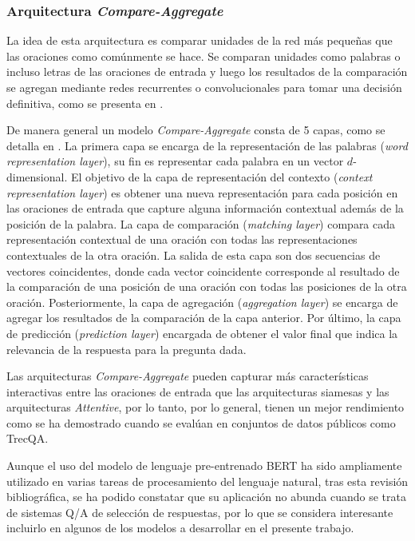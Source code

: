 \subsubsection{Arquitectura \textit{Compare-Aggregate}}

La idea de esta arquitectura es comparar unidades de la red más pequeñas que las oraciones como comúnmente se hace. Se comparan unidades como palabras o incluso letras de las oraciones de entrada y luego los resultados de la comparación se agregan mediante redes recurrentes o convolucionales para tomar una decisión definitiva, como se presenta en \cite{2018-tran-context}.

De manera general un modelo \textit{Compare-Aggregate} consta de 5 capas, como se detalla en \cite{2017-wang-bimpm}. La primera capa se encarga de la representación de las palabras (\textit{word representation layer}), su fin es representar cada palabra en un vector $d$-dimensional. El objetivo de la capa de representación del contexto (\textit{context representation layer}) es obtener una nueva representación para cada posición en las oraciones de entrada que capture alguna información contextual además de la posición de la palabra. La capa de comparación (\textit{matching layer}) compara cada representación contextual de una oración con todas las representaciones contextuales de la otra oración. La salida de esta capa son dos secuencias de vectores coincidentes, donde cada vector coincidente corresponde al resultado de la comparación de una posición de una oración con todas las posiciones de la otra oración. Posteriormente, la capa de agregación (\textit{aggregation layer}) se encarga de agregar los resultados de la comparación de la capa anterior. Por último, la capa de predicción (\textit{prediction layer}) encargada de obtener el valor final que indica la relevancia de la respuesta para la pregunta dada.

Las arquitecturas \textit{Compare-Aggregate} pueden capturar más características interactivas entre las oraciones de entrada que las arquitecturas siamesas y las arquitecturas \textit{Attentive}, por lo tanto, por lo general, tienen un mejor rendimiento como se ha demostrado cuando se evalúan en conjuntos de datos públicos como TrecQA.

Aunque el uso del modelo de lenguaje pre-entrenado BERT ha sido ampliamente utilizado en varias tareas de procesamiento del lenguaje natural, tras esta revisión bibliográfica, se ha podido constatar que su aplicación no abunda cuando se trata de sistemas Q/A de selección de respuestas, por lo que se considera interesante incluirlo en algunos de los modelos a desarrollar en el presente trabajo.

